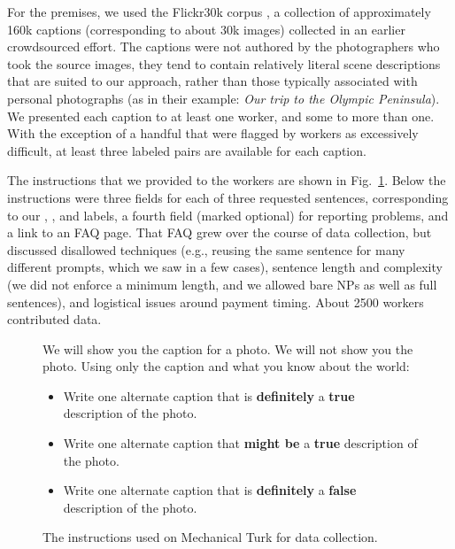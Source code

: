 For the premises, we used the Flickr30k corpus \cite{hodoshimage}, a collection of approximately 160k captions  (corresponding to about 30k images) collected in an earlier crowdsourced effort. The captions were not authored by the photographers who took the source images, they tend to contain relatively literal scene descriptions that are suited to our approach, rather than those typically associated with personal photographs (as in their example: \textit{Our trip to the Olympic Peninsula}). We presented each caption to at least one worker, and some to more than one. With the exception of a handful that were flagged by workers as excessively difficult, at least three labeled pairs are available for each caption.

The instructions that we provided to the workers are shown in Fig.~\ref{instructions-1}. Below the instructions were three fields for each of three requested sentences, corresponding to our , , and  labels, a fourth field (marked optional) for reporting problems, and a link to an FAQ page. That FAQ grew over the course of data collection, but discussed disallowed techniques (e.g., reusing the same sentence for many different prompts, which we saw in a few cases), sentence length and complexity (we did not enforce a minimum length, and we allowed bare NPs as well as full sentences), and logistical issues around payment timing. About 2500 workers contributed data.

\begin{figure}
\begin{framed}
\small
We will show you the caption for a photo. We will not show you the photo. Using only the caption and what you know about the world:
\begin{itemize}
\item Write one alternate caption that is \textbf{definitely} a \textbf{true} description of the photo. 
\item Write one alternate caption that \textbf{might be} a \textbf{true} description of the photo. 
\item Write one alternate caption that is \textbf{definitely} a \textbf{false} description of the photo. 
\end{itemize}
\end{framed}

\caption{\label{instructions-1}The instructions used on Mechanical Turk for data collection.}
\end{figure}

